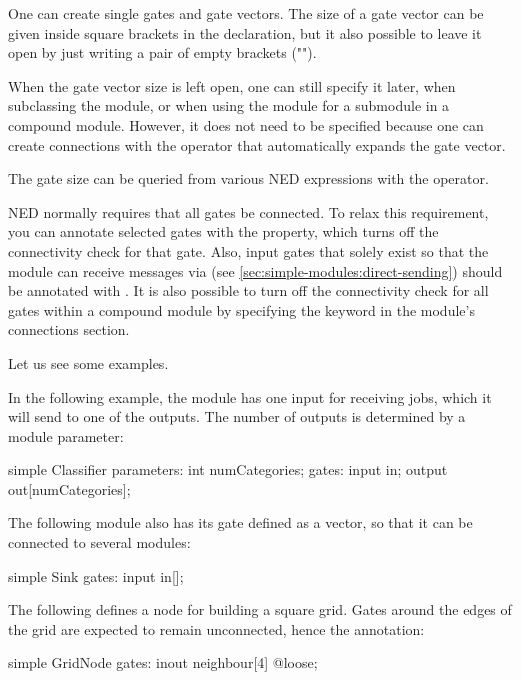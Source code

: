 One can create single gates and gate vectors. The size of a gate vector
can be given inside square brackets in the declaration, but it also possible
to leave it open by just writing a pair of empty brackets ("\ttt{[]}").

When the gate vector size is left open, one can still specify it later,
when subclassing the module, or when using the module for a submodule in a
compound module. However, it does not need to be specified because
one can create connections with the  operator that
automatically expands the gate vector.

The gate size can be queried from various NED expressions with the
 operator.

NED normally requires that all gates be connected. To relax this
requirement, you can annotate selected gates with the 
property, which turns off the connectivity check for that gate. Also, input
gates that solely exist so that the module can receive messages via
 (see \ref{sec:simple-modules:direct-sending}) should
be annotated with . It is also possible to turn off the connectivity
check for all gates within a compound module by specifying the
 keyword in the module's connections section.

Let us see some examples.

In the following example, the  module has one input for
receiving jobs, which it will send to one of the outputs. The number of
outputs is determined by a module parameter:

\begin{ned}
simple Classifier {
    parameters:
        int numCategories;
    gates:
        input in;
        output out[numCategories];
}
\end{ned}

The following  module also has its  gate defined
as a vector, so that it can be connected to several modules:

\begin{ned}
simple Sink {
    gates:
        input in[];
}
\end{ned}

The following defines a node for building a square grid. Gates around the edges of the grid are
expected to remain unconnected, hence the  annotation:

\begin{ned}
simple GridNode {
    gates:
        inout neighbour[4] @loose;
}
\end{ned}

